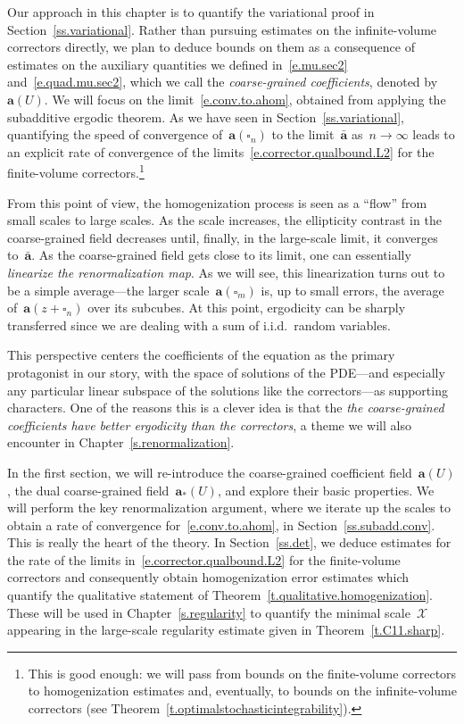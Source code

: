 \documentclass[11pt,twoside]{article} %
\let\oldsquare\square %
\renewcommand{\square}{\oldsquare}
\numberwithin{equation}{section}
\theoremstyle{definition}
\renewcommand{\a}{\mathbf{a}}
\newcommand{\ahom}{\bar{\a}}
\newcommand{\cu}{\square}
\newcommand{\X}{\mathcal{X}}
\begin{document}
\smallskip

Our approach in this chapter is to quantify the variational proof in Section~\ref{ss.variational}. 
Rather than pursuing estimates on the infinite-volume correctors directly, we plan to deduce bounds on them as a consequence of estimates on the auxiliary quantities we defined in~\eqref{e.mu.sec2} and~\eqref{e.quad.mu.sec2}, which we call the \emph{coarse-grained coefficients}, denoted by~$\a(U)$. 
We will focus on the limit~\eqref{e.conv.to.ahom}, obtained from applying the subadditive ergodic theorem. 
As we have seen in Section~\ref{ss.variational}, quantifying the speed of convergence of~$\a(\cu_n)$ to the limit~$\ahom$ as~$n\to \infty$ leads to an explicit rate of convergence of the limits~\eqref{e.corrector.qualbound.L2} for the finite-volume correctors.\footnote{This is good enough: we will pass from bounds on the finite-volume correctors to homogenization estimates and, eventually, to bounds on the infinite-volume correctors (see Theorem~\ref{t.optimalstochasticintegrability}).}

\smallskip

From this point of view, the homogenization process is seen as a ``flow'' from small scales to large scales. As the scale increases, the ellipticity contrast in the coarse-grained field decreases until, finally, in the large-scale limit, it converges to~$\ahom$. 
As the coarse-grained field gets close to its limit, one can essentially \emph{linearize the renormalization map}. As we will see, this linearization turns out to be a simple average---the larger scale~$\a(\cu_m)$ is, up to small errors, the average of~$\a(z+\cu_n)$ over its subcubes. At this point, ergodicity can be sharply transferred since we are dealing with a sum of i.i.d.~random variables. 

\smallskip

This perspective centers the coefficients of the equation as the primary protagonist in our story, with the space of solutions of the PDE---and especially any particular linear subspace of the solutions like the correctors---as supporting characters. One of the reasons this is a clever idea is that the \emph{the coarse-grained coefficients have better ergodicity than the correctors}, a theme we will also encounter in Chapter~\ref{s.renormalization}. 

\smallskip

In the first section, we will re-introduce the coarse-grained coefficient field~$\a(U)$, the dual coarse-grained field~$\a_*(U)$, and explore their basic properties. We will perform the key renormalization argument, where we iterate up the scales to obtain a rate of convergence for~\eqref{e.conv.to.ahom}, in Section~\ref{ss.subadd.conv}. This is really the heart of the theory. 
In Section~\ref{ss.det}, we deduce estimates for the rate of the limits in~\eqref{e.corrector.qualbound.L2} for the finite-volume correctors and consequently obtain homogenization error estimates which quantify the qualitative statement of Theorem~\ref{t.qualitative.homogenization}. These will be used in Chapter~\ref{s.regularity} to quantify the minimal scale~$\X$ appearing in the large-scale regularity estimate given in Theorem~\ref{t.C11.sharp}. 
\end{document}

